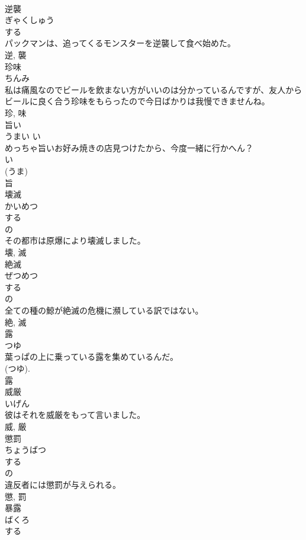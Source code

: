 \documentclass[8pt]{extreport}
\begin{document}
\begin{CJK}{UTF8}{min}
\\	逆襲	
\\	ぎゃくしゅう	
\\	する 
\\	パックマンは、追ってくるモンスターを逆襲して食べ始めた。	
\\	逆, 襲	
\\	珍味	
\\	ちんみ	
\\	私は痛風なのでビールを飲まない方がいいのは分かっているんですが、友人からビールに良く合う珍味をもらったので今日ばかりは我慢できませんね。	
\\	珍, 味	
\\	旨い	
\\	うまい	い 
\\	めっちゃ旨いお好み焼きの店見つけたから、今度一緒に行かへん？	
\\	い 
\\	(うま) 
\\	旨	
\\	壊滅	
\\	かいめつ	
\\	する 
\\	の 
\\	その都市は原爆により壊滅しました。	
\\	壊, 滅	
\\	絶滅	
\\	ぜつめつ	
\\	する 
\\	の 
\\	全ての種の鯨が絶滅の危機に瀕している訳ではない。	
\\	絶, 滅	
\\	露	
\\	つゆ	
\\	葉っぱの上に乗っている露を集めているんだ。	
\\	(つゆ). 
\\	露	
\\	威厳	
\\	いげん	
\\	彼はそれを威厳をもって言いました。	
\\	威, 厳	
\\	懲罰	
\\	ちょうばつ	
\\	する 
\\	の 
\\	違反者には懲罰が与えられる。	
\\	懲, 罰	
\\	暴露	
\\	ばくろ	
\\	する 

\end{CJK}
\end{document}
